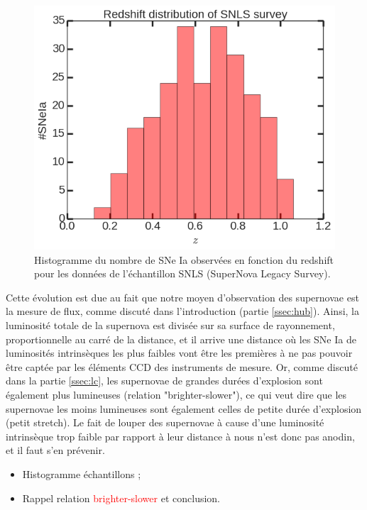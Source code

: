 \documentclass[a4paper, 12pt, svgnames]{article}
\begin{document}
\begin{figure}[htbp!]
    \centering
    \includegraphics[width=.5\linewidth]{Rapport_figures/redshift_miss.png}
    \captionsetup{justification=centering}
    \caption{Histogramme du nombre de SNe Ia observées en fonction du redshift
    pour les données de l'échantillon SNLS (SuperNova Legacy Survey).}
    \label{redshift_miss}
\end{figure}

Cette évolution est due au fait que notre moyen d'observation des supernovae est
la mesure de flux, comme discuté dans l'introduction (partie \ref{ssec:hub}).
Ainsi, la luminosité totale de la supernova est divisée sur sa surface de
rayonnement, proportionnelle au carré de la distance, et il arrive une distance
où les SNe Ia de luminosités intrinsèques les plus faibles vont être les
premières à ne pas pouvoir être captée par les éléments CCD des instruments de
mesure. Or, comme discuté dans la partie \ref{ssec:lc}, les supernovae de
grandes durées d'explosion sont également plus lumineuses (relation
"brighter-slower"), ce qui veut dire que les supernovae les moins lumineuses
sont également celles de petite durée d'explosion (petit stretch). Le fait de
louper des supernovae à cause d'une luminosité intrinsèque trop faible par
rapport à leur distance à nous n'est donc pas anodin, et il faut s'en prévenir.

\begin{itemize}
    \item Histogramme échantillons ;
    \item Rappel relation \textcolor{red}{brighter-slower} et conclusion.
\end{itemize}
\end{document}
